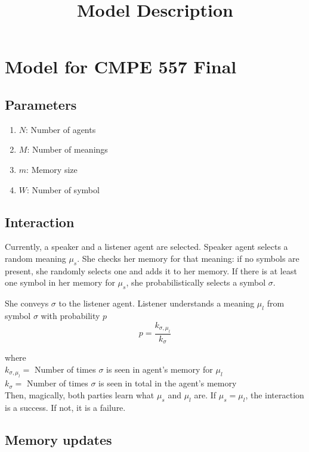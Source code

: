 \documentclass{article}
\title{Model Description}
\begin{document}
\maketitle

\section{Model for CMPE 557 Final}
\subsection{Parameters}
\begin{enumerate}
    \item $N$: Number of agents
    \item $M$: Number of meanings
    \item $m$: Memory size
    \item $W$: Number of symbol
\end{enumerate}

\subsection{Interaction}
Currently, a speaker and a listener agent are selected. Speaker agent selects a random meaning $\mu_{s}$. She checks her memory for that meaning: if no symbols are present, she randomly selects one and adds it to her memory. If there is at least one symbol in her memory for $\mu_{s}$, she probabilistically selects a symbol $\sigma$.

She conveys $\sigma$ to the listener agent. Listener understands a meaning $\mu_{l}$ from symbol $\sigma$ with probability $p$
\\
\begin{equation}
    p=\frac{k_{\sigma,\mu_{l}}}{k_{\sigma}}    
\end{equation}


where \\

$k_{\sigma,\mu_{l}}=$ Number of times $\sigma$ is seen in agent's memory for $\mu_{l}$ \\

$k_{\sigma}=$ Number of times $\sigma$ is seen in total in the agent's memory
\\

Then, magically, both parties learn what $\mu_{s}$ and $\mu_{l}$ are.
If $\mu_{s}=\mu_{l}$, the interaction is a success. If not, it is a failure.

\subsection{Memory updates}
\end{document}
